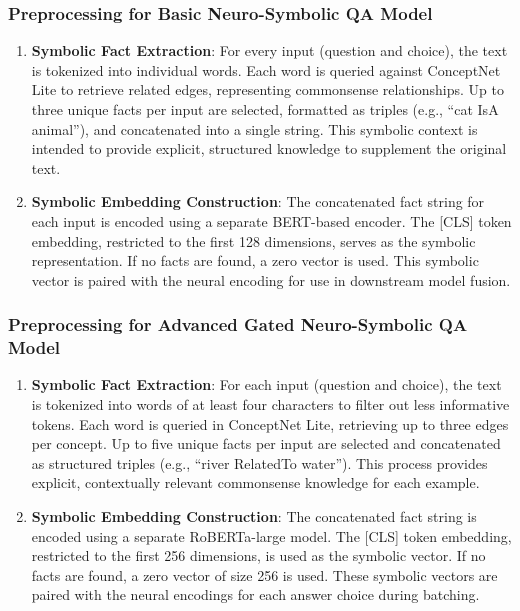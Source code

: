 \documentclass[10.5pt]{article}
\begin{document}
\subsubsection{Preprocessing for Basic Neuro-Symbolic QA Model}
\begin{enumerate}
    \item \textbf{Symbolic Fact Extraction}: For every input (question and choice), the text is tokenized into individual words. Each word is queried against ConceptNet Lite to retrieve related edges, representing commonsense relationships. Up to three unique facts per input are selected, formatted as triples (e.g., “cat IsA animal”), and concatenated into a single string. This symbolic context is intended to provide explicit, structured knowledge to supplement the original text.
    \item \textbf{Symbolic Embedding Construction}: The concatenated fact string for each input is encoded using a separate BERT-based encoder. The [CLS] token embedding, restricted to the first 128 dimensions, serves as the symbolic representation. If no facts are found, a zero vector is used. This symbolic vector is paired with the neural encoding for use in downstream model fusion.
\end{enumerate}

\subsubsection{Preprocessing for Advanced Gated Neuro-Symbolic QA Model}
\begin{enumerate}
    \item \textbf{Symbolic Fact Extraction}: For each input (question and choice), the text is tokenized into words of at least four characters to filter out less informative tokens. Each word is queried in ConceptNet Lite, retrieving up to three edges per concept. Up to five unique facts per input are selected and concatenated as structured triples (e.g., “river RelatedTo water”). This process provides explicit, contextually relevant commonsense knowledge for each example.
    \item \textbf{Symbolic Embedding Construction}: The concatenated fact string is encoded using a separate RoBERTa-large model. The [CLS] token embedding, restricted to the first 256 dimensions, is used as the symbolic vector. If no facts are found, a zero vector of size 256 is used. These symbolic vectors are paired with the neural encodings for each answer choice during batching.
\end{enumerate}
\end{document}

